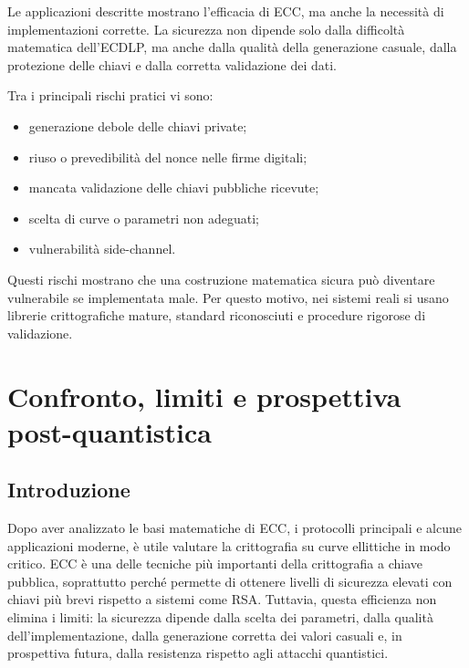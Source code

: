 \documentclass[12pt,a4paper,oneside]{report}
\begin{document}
Le applicazioni descritte mostrano l'efficacia di ECC, ma anche la necessità di implementazioni corrette. La sicurezza non dipende solo dalla difficoltà matematica dell'ECDLP, ma anche dalla qualità della generazione casuale, dalla protezione delle chiavi e dalla corretta validazione dei dati.

Tra i principali rischi pratici vi sono:

\begin{itemize}
    \item generazione debole delle chiavi private;
    \item riuso o prevedibilità del nonce nelle firme digitali;
    \item mancata validazione delle chiavi pubbliche ricevute;
    \item scelta di curve o parametri non adeguati;
    \item vulnerabilità side-channel.
\end{itemize}

Questi rischi mostrano che una costruzione matematica sicura può diventare vulnerabile se implementata male. Per questo motivo, nei sistemi reali si usano librerie crittografiche mature, standard riconosciuti e procedure rigorose di validazione.

\chapter{Confronto, limiti e prospettiva post-quantistica}

\section{Introduzione}

Dopo aver analizzato le basi matematiche di ECC, i protocolli principali e alcune applicazioni moderne, è utile valutare la crittografia su curve ellittiche in modo critico. ECC è una delle tecniche più importanti della crittografia a chiave pubblica, soprattutto perché permette di ottenere livelli di sicurezza elevati con chiavi più brevi rispetto a sistemi come RSA. Tuttavia, questa efficienza non elimina i limiti: la sicurezza dipende dalla scelta dei parametri, dalla qualità dell'implementazione, dalla generazione corretta dei valori casuali e, in prospettiva futura, dalla resistenza rispetto agli attacchi quantistici.
\end{document}
